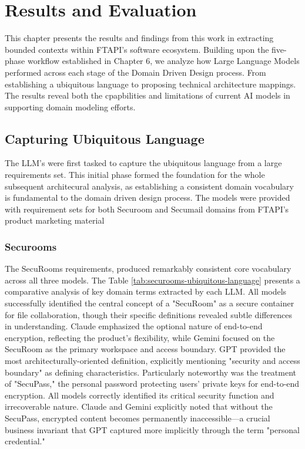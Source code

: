 \chapter{Results and Evaluation}\label{chapter:results}

This chapter presents the results and findings from this work in extracting bounded contexts within FTAPI's software ecosystem. Building upon the five-phase workflow established in Chapter 6, we analyze how Large Language Models performed across each stage of the Domain Driven Design process. From establishing a ubiquitous language to proposing technical architecture mappings. The results reveal both the cpapbilities and limitations of current AI models in supporting domain modeling efforts.

\section{Capturing Ubiquitous Language}
The LLM's were first tasked to capture the ubiquitous language from a large requirements set. This initial phase formed the foundation for the whole subsequent architecural analysis, as establishing a consistent domain vocabulary is fundamental to the domain driven design process. The models were provided with requirement sets for both Securoom and Secumail domains from FTAPI's product marketing material

\subsection{Securooms}
The SecuRooms requirements, produced remarkably consistent core vocabulary across all three models. The Table \ref{tab:securooms-ubiquitous-language} presents a comparative analysis of key domain terms extracted by each LLM. All models successfully identified the central concept of a "SecuRoom" as a secure container for file collaboration, though their specific definitions revealed subtle differences in understanding. Claude emphasized the optional nature of end-to-end encryption, reflecting the product's flexibility, while Gemini focused on the SecuRoom as the primary workspace and access boundary. GPT provided the most architecturally-oriented definition, explicitly mentioning "security and access boundary" as defining characteristics. Particularly noteworthy was the treatment of "SecuPass," the personal password protecting users' private keys for end-to-end encryption. All models correctly identified its critical security function and irrecoverable nature. Claude and Gemini explicitly noted that without the SecuPass, encrypted content becomes permanently inaccessible—a crucial business invariant that GPT captured more implicitly through the term "personal credential."

